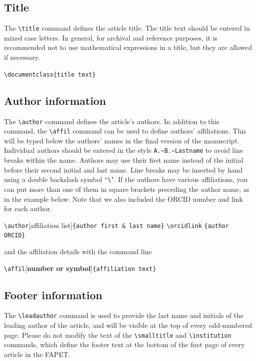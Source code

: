\documentclass[9pt,article,twoside]{fapet-rho-class/fapet-rho}
\newcommand{\CS}[1]{\texttt{\textbackslash #1}}
\begin{document}
    \subsection{Title}

        The \CS{title} command defines the article title. The title text should be entered in mixed case letters. In general, for archival and reference purposes, it is recommended not to use mathematical expressions in a title, but they are allowed if necessary. 

        \bigskip
        \verb|\documentclass{title text}|
        \bigskip

    \subsection{Author information}
    
        The \CS{author} command defines the article’s authors. In addition to this command, the \CS{affil} command can be used to define authors’ affiliations. This will be typed below the authors’ names in the final version of the manuscript. Individual authors should be entered in the style \texttt{A.\~{}B.\~{}Lastname} to avoid line breaks within the name. Authors may use their first name instead of the initial before their second initial and last name.  Line breaks may be inserted by hand using a double backslash symbol “\CS \CS". If the authors have various affiliations, you can put more than one of them in square brackets preceding the author name, as in the example below: Note that we also included the ORCID number and link for each author.
    
        \bigskip
        
        \CS{author}[{affiliation list}]\verb|{author first & last name}|  \CS{orcidlink} \verb|{author ORCID}|
        
        \bigskip
        and the affiliation details with the command line
        
        \bigskip
        \CS{affil}[\textbf{number or symbol}]\verb|{affiliation text}|

        \bigskip
    
    \subsection{Footer information}
    
        The \CS{leadauthor} command is used to provide the last name and initials of the leading author of the article, and will be visible at the top of every odd-numbered page. Please do not modify the text of the \CS{smalltitle} and \CS{institution} commands, which define the footer text at the bottom of the first page of every article in the FAPET.
    
\end{document}
